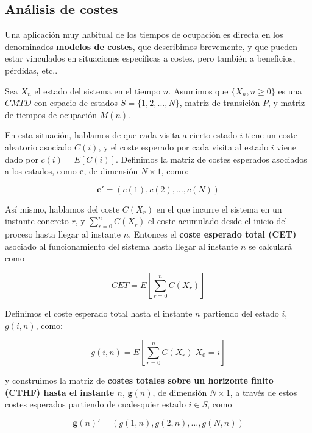 \documentclass[
]{book}
\theoremstyle{definition}
\theoremstyle{definition}
\theoremstyle{definition}
\theoremstyle{definition}
\theoremstyle{remark}
\begin{document}
\hypertarget{anuxe1lisis-de-costes}{%
\subsection{Análisis de costes}\label{anuxe1lisis-de-costes}}

Una aplicación muy habitual de los tiempos de ocupación es directa en los denominados \textbf{modelos de costes}, que describimos brevemente, y que pueden estar vinculados en situaciones específicas a costes, pero también a beneficios, pérdidas, etc..

Sea \(X_n\) el estado del sistema en el tiempo \(n\). Asumimos que \(\{X_n, n \geq 0 \}\) es una \(CMTD\) con espacio de estados \(S =\{1, 2,...,N\}\), matriz de transición \(P\), y matriz de tiempos de ocupación \(M(n)\).

En esta situación, hablamos de que cada visita a cierto estado \(i\) tiene un coste aleatorio asociado \(C(i)\), y el coste esperado por cada visita al estado \(i\) viene dado por \(c(i) = E[C(i)]\). Definimos la matriz de costes esperados asociados a los estados, como \(\mathbf{c}\), de dimensión \(N\times 1\), como:

\[\mathbf{c}' = (c(1),c(2),\ldots,c(N))\]

Así mismo, hablamos del coste \(C(X_r)\) en el que incurre el sistema en un instante concreto \(r\), y \(\sum_{r=0}^n C(X_r)\) el coste acumulado desde el inicio del proceso hasta llegar al instante \(n\). Entonces el \textbf{coste esperado total (CET)} asociado al funcionamiento del sistema hasta llegar al instante \(n\) se calculará como

\[CET=E\left[\sum_{r=0}^n C(X_r)\right]\]

Definimos el coste esperado total hasta el instante \(n\) partiendo del estado \(i\), \(g(i,n)\), como:

\[g(i,n) = E\left[\sum_{r=0}^n C(X_r)| X_0 = i \right]\]

y construimos la matriz de \textbf{costes totales sobre un horizonte finito (CTHF) hasta el instante \(n\)}, \(\mathbf{g}(n)\), de dimensión \(N \times 1\), a través de estos costes esperados partiendo de cualesquier estado \(i \in S\), como

\[\mathbf{g}(n)' = (g(1,n),g(2,n),\ldots,g(N,n))\]
\end{document}

